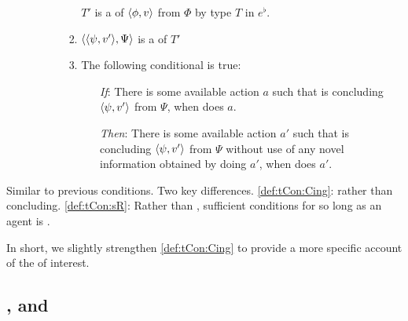 \begin{note}
\begin{definition}
\begin{itemize}
\begin{enumerate}[label=\arabic*., ref=(\arabic*)]
\begin{enumerate}[label=\alph*., ref=(\arabic{enumi}\alph*)]
\begin{enumerate}[label=\roman*., ref=(\arabic{enumi}\alph{enumii}.\roman*)]
            \label{def:tCon:sR:rep}
            \(T'\) is a \tRep{} of \vAgent{} \tCV{} \(\langle \phi, v \rangle\) from \(\Phi\) by type \(T\) in \(e^{\flat}\).
          \item
            \label{def:tCon:sR:tI}
            \(\langle \langle \psi, v' \rangle, \Psi \rangle\) is a \tI{} of \(T'\)
          \item
            \label{def:tCon:sR:itc}
            The following conditional is true:
            \begin{itemize}
            \item[\emph{If}:]
              There is some available action \(a\) such that \vAgent{} is concluding \(\langle \psi, v' \rangle\) from \(\Psi\), when \vAgent{} does \(a\).
            \item[\emph{Then}:]
              There is some available action \(a'\) such that \vAgent{} is concluding \(\langle \psi, v' \rangle\) from \(\Psi\) without use of any novel information obtained by doing \(a'\), when \vAgent{} does \(a'\).
            \end{itemize}
          \end{enumerate}
        \end{enumerate}
      \end{enumerate}
    \end{itemize}
    \vspace{-1.5\baselineskip}
  \end{definition}

  \noindent%
  Similar to previous conditions.
  Two key differences.
  \ref{def:tCon:Cing}: \tCV{} rather than concluding.
  \ref{def:tCon:sR}: Rather than \requ{}, sufficient conditions for \requ{} so long as an agent is \tCV{}.

  In short, we slightly strengthen \ref{def:tCon:Cing} to provide a more specific account of the  of interest.
\end{note}

\subsection{, \qWhyV{} and \issueConstraint{}}
\label{sec:tccon2-qwhyv-}

